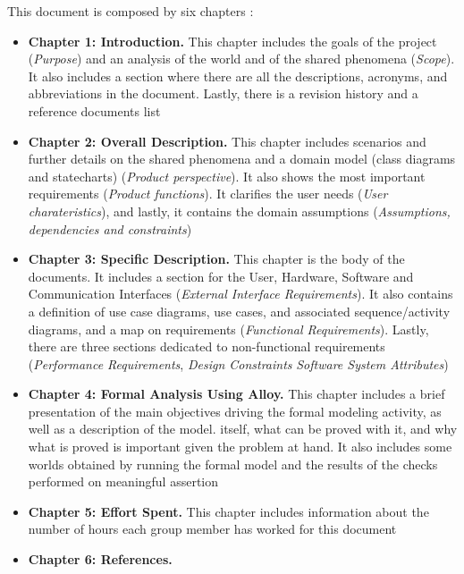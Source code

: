 This document is composed by six chapters :
\begin{itemize}
    \item \textbf{Chapter 1: Introduction.} This chapter includes the goals of the project (\textit{Purpose}) 
    and an analysis of the world and of the shared phenomena (\textit{Scope}). It also includes a section where 
    there are all the descriptions, acronyms, and abbreviations in the document. Lastly, there 
    is a revision history and a reference documents list
    \item \textbf{Chapter 2: Overall Description.} This chapter includes scenarios and further
    details on the shared phenomena and a domain model (class diagrams and statecharts) (\textit{Product perspective}). It also
    shows the most important requirements (\textit{Product functions}). It clarifies the user needs (\textit{User charateristics}), and lastly, it contains 
    the domain assumptions (\textit{Assumptions, dependencies and constraints})
    \item \textbf{Chapter 3: Specific Description.} This chapter is the body of the documents. It includes a section for 
    the User, Hardware, Software and Communication Interfaces (\textit{External Interface Requirements}). It also contains a definition
    of use case diagrams, use cases, and associated sequence/activity diagrams, and a map on requirements (\textit{Functional Requirements}).
    Lastly, there are three sections dedicated to non-functional requirements (\textit{Performance Requirements}, \textit{Design Constraints} \textit{Software System Attributes})
    \item \textbf{Chapter 4: Formal Analysis Using Alloy.} This chapter includes a brief presentation of the
    main objectives driving the formal modeling activity, as well as a description of the model.
    itself, what can be proved with it, and why what is proved is important given the problem at hand. It also includes some worlds obtained by running the
    formal model and the results of the checks performed on meaningful assertion
    \item \textbf{Chapter 5: Effort Spent.}  This chapter includes information about the number of hours each group member has worked for this document
    \item \textbf{Chapter 6: References.}
\end{itemize}